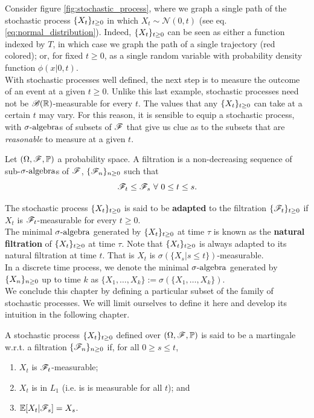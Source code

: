 \documentclass[../TGMAFFIRO.tex]{subfiles}
\begin{document}
Consider figure \ref{fig:stochastic_process}, where we graph a single path of the stochastic process $\{X_t\}_{t\geq 0}$ in which $X_t \sim \mathcal{N}(0, t)$ (see eq. \ref{eq:normal_distribution}). Indeed, $\{X_t\}_{t\geq 0}$ can be seen as either a function indexed by $T$, in which case we graph the path of a single trajectory (red colored); or, for fixed $t\geq 0$, as a single random variable with probability density function $\phi(x | 0, t)$.\\

With stochastic processes well defined, the next step is to measure the outcome of an event at a given $t \geq 0$. Unlike this last example, stochastic processes need not be $\mathscr{B}(\mathbb{R})$-measurable for every $t$. The values that any $\{X_t\}_{t\geq 0}$ can take at a certain $t$ may vary. For this reason, it is sensible to equip a stochastic process, with $\sigma\text{-algebra}$s of subsets of $\mathscr{F}$ that give us clue as to the subsets that are \textit{reasonable} to measure at a given $t$. 

\begin{definition}
Let $(\Omega, \mathscr{F}, \mathbb{P})$ a probability space. A filtration is a non-decreasing sequence of sub-$\sigma\text{-algebra}$s of $\mathscr{F}$, $\{\mathscr{F}_n\}_{n\geq 0}$ such that 
\[
	\mathscr{F}_t \leq \mathscr{F}_s \ \forall \ 0 \leq t \leq s.
\]
\end{definition}

The stochastic process $\{X_t\}_{t\geq 0}$ is said to be \textbf{adapted} to the filtration $\{\mathscr{F}_t\}_{t\geq 0}$ if $X_t$ is $\mathscr{F}_t$-measurable for every $t\geq 0$.\\

The minimal $\sigma\text{-algebra}$ generated by $\{X_t\}_{t\geq 0}$ at time $\tau$ is known as the \textbf{natural filtration} of $\{X_t\}_{t\geq 0}$ at time $\tau$. Note that $\{X_t\}_{t\geq 0}$ is always adapted to its natural filtration at time $t$. That is $X_t$ is $\sigma(\{X_s | s \leq t\})$-measurable.\\

In a discrete time process, we denote the minimal $\sigma\text{-algebra}$ generated by $\{X_n\}_{n\geq 0}$ up to time $k$ as $\{X_1, \ldots, X_k\} := \sigma(\{X_1, \ldots, X_k\})$.\\

We conclude this chapter by defining a particular subset of the family of stochastic processes. We will limit ourselves to define it here and develop its intuition in the following chapter.

\begin{definition}\label{def:martingale}
	A stochastic process $\{X_t\}_{t\geq 0}$ defined over $(\Omega, \mathscr{F}, \mathbb{P})$ is said to be a martingale w.r.t. a filtration $\{\mathscr{F}_n\}_{n\geq 0}$ if, for all $0 \geq s \leq t$,
	\begin{enumerate}
		\item $X_t$ is $\mathscr{F}_t$-measurable;
		\item $X_t$ is in $L_1$ (i.e. is is measurable for all $t$); and
		\item $\mathbb{E}[X_t | \mathscr{F}_s] = X_s$.
	\end{enumerate}
\end{definition}
\end{document}
